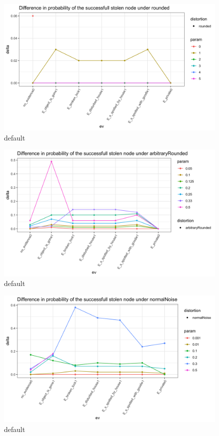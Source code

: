 \documentclass[11pt]{amsart}
\begin{document}
\begin{figure}[htbp]
\begin{center}
\includegraphics[width=\linewidth]{images/roundeddelta.png}
\caption{default}
\label{default}
\end{center}
\end{figure}

\begin{figure}[htbp]
\begin{center}
\includegraphics[width=\linewidth]{images/arbitraryRoundeddelta.png}
\caption{default}
\label{default}
\end{center}
\end{figure}

\begin{figure}[htbp]
\begin{center}
\includegraphics[width=\linewidth]{images/normalNoisedelta.png}
\caption{default}
\label{default}
\end{center}
\end{figure}
\end{document}
